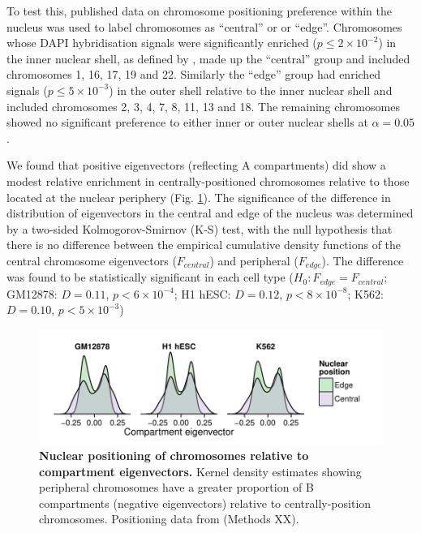 \documentclass[a4paper,10pt,oneside]{book}
\begin{document}
To test this, published data on chromosome positioning preference within
the nucleus was used to label chromosomes as ``central'' or 
or ``edge''.\cite{Boyle2001} Chromosomes whose DAPI hybridisation
signals were significantly enriched ($p\leq 2\times10^{-2}$) in the inner nuclear shell, as
defined by \citet{Boyle2001}, made up the ``central''
group and included chromosomes 1, 16, 17, 19 and 22. Similarly the ``edge'' group
had enriched signals ($p\leq 5\times10^{-3}$) in the outer shell relative to the inner nuclear
shell and included chromosomes 2, 3, 4, 7, 8, 11, 13 and 18. The remaining
chromosomes showed no significant preference to either inner or
outer nuclear shells at $\alpha = 0.05$.\cite{Boyle2001} 

We found that positive eigenvectors (reflecting A compartments) did show a modest relative enrichment in centrally-positioned chromosomes relative to those located at the nuclear periphery (Fig. \ref{fig:nucpos}). The significance
of the difference in distribution of eigenvectors in the central
and edge of the nucleus was determined by a two-sided Kolmogorov-Smirnov (K-S)
test, with the null hypothesis that there is no difference between the empirical cumulative
density functions of the central chromosome eigenvectors ($F_{central}$)
and peripheral ($F_{edge}$). The difference was found to be statistically significant in each cell type ($H_0: F_{edge} = F_{central}$; GM12878: $D = 0.11$, $p < 6 \times 10^{-4}$; H1 hESC: $D = 0.12$, $p < 8 \times 10^{-8}$; K562: $D = 0.10$, $p < 5 \times 10^{-3}$)

\begin{figure}
\begin{center} 
\includegraphics[width=\textwidth]{figs/nucpos.pdf}
\captionsetup{width=\textwidth} 
\caption{ {\bf Nuclear positioning of chromosomes relative to compartment eigenvectors. }
Kernel density estimates showing peripheral chromosomes have a greater proportion of B compartments (negative eigenvectors) relative to centrally-position chromosomes. Positioning data from \citet{Boyle2001} (Methods XX).
}\label{fig:nucpos}
\end{center} 
\end{figure} 


\begin{small}

\end{small}
\end{document}
